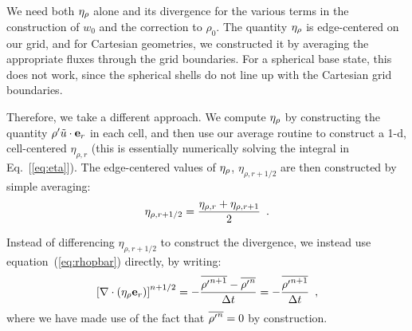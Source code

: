 We need both $\eta_{\rho}$ alone and its divergence for the
various terms in the construction of $w_0$ and the correction to
$\rho_0$.  The quantity $\eta_{\rho}$ is edge-centered on our grid, and
for Cartesian geometries, we constructed it by averaging the
appropriate fluxes through the grid boundaries.  For a spherical base
state, this does not work, since the spherical shells do not line up
with the Cartesian grid boundaries.

Therefore, we take a different approach.  We compute $\eta_{\rho}$ by
constructing the quantity ${\rho^{\prime}} \tilde{u} \cdot \mathbf{e}_r$ in each cell, and then
use our average routine to construct a 1-d, cell-centered
$\eta_{\rho,r}$ (this is essentially numerically solving the integral
in Eq.~[\ref{eq:eta}]).  The edge-centered values of $\eta_{\rho}$,
$\eta_{\rho,r+1/2}$ are then constructed by simple
averaging: 
\begin{equation}
\eta_{\rho,r+1/2} = \frac{\eta_{\rho,r} + \eta_{\rho,r+1}}{2} \enskip .
\end{equation}

Instead of differencing $\eta_{\rho,r+1/2}$ to construct the 
divergence, we instead use equation~(\ref{eq:rhopbar}) directly, by writing:
\begin{equation}
\left [ \nabla \cdot (\eta_{\rho} \mathbf{e}_r ) \right ]^{n+1/2}
= - \frac{\overline{{\rho^{\prime}}^{n+1}} - \overline{{\rho^{\prime}}^n}}{\Delta t}
= - \frac{\overline{{\rho^{\prime}}^{n+1}}}{\Delta t} \enskip ,
\end{equation}
where we have made use of the fact that $\overline{{\rho^{\prime}}^n} = 0$ by construction.


